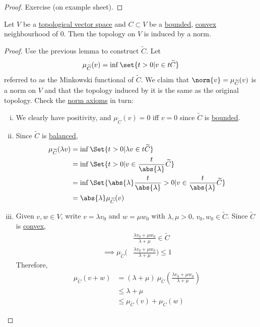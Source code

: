 \documentclass{article}
\begin{document}
\begin{proof}
    Exercise (on example sheet).
\end{proof}

\begin{prop}
    Let $V$ be a \hyperlink{def:topological-vector-space}{topological vector space} and $C \subset V$ be a \hyperlink{def:bounded}{bounded}, \hyperlink{def:convex-subset}{convex} neighbourhood of $0$. Then the topology on $V$ is induced by a norm.
\end{prop}

\begin{proof}
    Use the previous lemma to construct $\widetilde C$. Let
    \begin{equation*}
        \mu_{\widetilde C}(v) = \inf\set{t > 0 | v \in t \widetilde C}
    \end{equation*}
    referred to as the Minkowski functional of $\widetilde C$.
    We claim that $\norm{v} = \mu_{\widetilde C}(v)$ is a norm on $V$ and that the topology induced by it is the same as the original topology.
    Check the \hyperlink{def:normed-vector-space}{norm axioms} in turn:
    \begin{enumerate}[i.]
        \item We clearly have positivity, and $\mu_{\widetilde C}(v) = 0$ iff $v = 0$ since $\widetilde C$ is \hyperlink{def:bounded}{bounded}.
        \item Since $\widetilde C$ is \hyperlink{def:balanced}{balanced},
            \begin{align*}
                \mu_{\widetilde C} (\lambda v) &= \inf\Set{t > 0 | \lambda v \in t \widetilde C} \\
                &= \inf\Set{t > 0 | v \in \frac{t}{\abs{\lambda}} \widetilde C} \\
                &= \inf\Set{\abs{\lambda} \frac{t}{\abs{\lambda}} > 0 | v \in \frac{t}{\abs{\lambda}} \widetilde C} \\
                &= \abs{\lambda} \mu_{\widetilde C}(v)
            \end{align*}
        \item Given $v, w \in V$, write $v = \lambda v_0$ and $w = \mu w_0$ with $\lambda, \mu > 0$, $v_0, w_0 \in \widetilde C$.
            Since $\widetilde C$ is \hyperlink{def:convex-subset}{convex},
            \begin{align*}
                &\frac{\lambda v_0 + \mu w_0}{\lambda + \mu} \in \widetilde C \\
                \implies \mu_{\widetilde C} \bigg(&\frac{\lambda v_0 + \mu w_0}{\lambda + \mu}\bigg) \leq 1
            \end{align*}
            Therefore,
            \begin{align*}
                \mu_{\widetilde C} (v + w) &= (\lambda + \mu) \ \mu_{\widetilde C} \left(\frac{\lambda v_0 + \mu w_0}{\lambda + \mu}\right) \\
                &\leq \lambda + \mu \\
                &\leq \mu_{\widetilde C}(v) + \mu_{\widetilde C}(w)
            \end{align*}
    \end{enumerate}
\end{proof}
\end{document}
